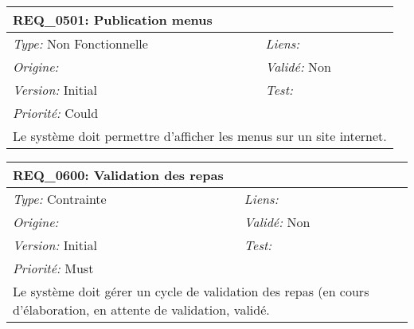 \begin{table}[!h]

\begin{tabular}{|p{60mm}p{100mm}|}

\hline

\multicolumn{2}{|l|}{\textbf{REQ\_0501:} Publication menus} \\ \hline

\emph{Type:} Non Fonctionnelle & \emph{Liens:}  \\

\emph{Origine:}  & \emph{Validé:} Non \\

\emph{Version:} Initial & \emph{Test:}  \\

\emph{Priorité:} Could & \\ \hline

\multicolumn{2}{|p{16cm}|}{Le système doit permettre d'afficher les menus sur un site internet.} \\ \hline

\end{tabular}

\end{table}



\begin{table}[!h]

\begin{tabular}{|p{60mm}p{100mm}|}

\hline

\multicolumn{2}{|l|}{\textbf{REQ\_0600:} Validation des repas} \\ \hline

\emph{Type:} Contrainte & \emph{Liens:}  \\

\emph{Origine:}  & \emph{Validé:} Non \\

\emph{Version:} Initial & \emph{Test:}  \\

\emph{Priorité:} Must & \\ \hline

\multicolumn{2}{|p{16cm}|}{Le système doit gérer un cycle de validation des repas (en cours d'élaboration, en attente de validation, validé.} \\ \hline

\end{tabular}

\end{table}



